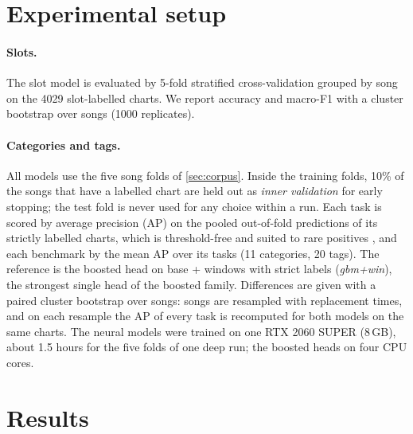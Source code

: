 \documentclass[10pt,twocolumn]{article}
\begin{document}
\section{Experimental setup}\label{sec:setup}
\paragraph{Slots.} The slot model is evaluated by 5-fold stratified cross-validation grouped by song on the \num{4029} slot-labelled charts. We report accuracy and macro-F1 with a cluster bootstrap over songs \citep{efron1993bootstrap} (\num{1000} replicates).

\paragraph{Categories and tags.} All models use the five song folds of \cref{sec:corpus}. Inside the training folds, 10\% of the songs that have a labelled chart are held out as \emph{inner validation} for early stopping; the test fold is never used for any choice within a run. Each task is scored by average precision (AP) on the pooled out-of-fold predictions of its strictly labelled charts, which is threshold-free and suited to rare positives \citep{davis2006pr,saito2015pr}, and each benchmark by the mean AP over its tasks (11 categories, 20 tags). The reference is the boosted head on base + windows with strict labels (\emph{gbm+win}), the strongest single head of the boosted family. Differences are given with a paired cluster bootstrap over songs: songs are resampled with replacement \nBoot{} times, and on each resample the AP of every task is recomputed for both models on the same charts. The neural models were trained on one RTX 2060 SUPER (8\,GB), about 1.5 hours for the five folds of one deep run; the boosted heads on four CPU cores.

\section{Results}\label{sec:results}
\end{document}
